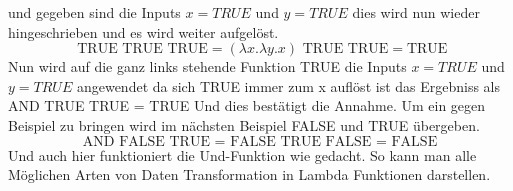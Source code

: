 und gegeben sind die Inputs $x = TRUE$ und $y = TRUE$ dies wird nun wieder hingeschrieben und es wird weiter aufgelöst. 
\begin{equation}
\text{ TRUE TRUE TRUE} = (\lambda x. \lambda y. x) \text{ TRUE TRUE} = \text{TRUE}
\end{equation}
Nun wird auf die ganz links stehende Funktion TRUE die Inputs $x = TRUE$ und $y = TRUE$ angewendet da sich TRUE immer zum x auflöst ist das Ergebniss als AND TRUE TRUE = TRUE
Und dies bestätigt die Annahme. Um ein gegen Beispiel zu bringen wird im nächsten Beispiel FALSE und TRUE übergeben.
\begin{equation}
\text{AND FALSE TRUE = FALSE TRUE FALSE = FALSE}
\end{equation}
Und auch hier funktioniert die Und-Funktion wie gedacht. So kann man alle Möglichen Arten von Daten Transformation in Lambda Funktionen darstellen. 
\cite{lambdacalculus}

